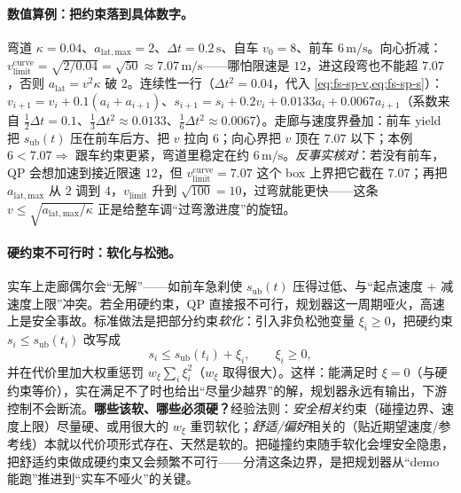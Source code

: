\paragraph{数值算例：把约束落到具体数字。}
弯道 $\kappa=0.04$、$a_{\mathrm{lat,max}}=2$、$\Delta t=0.2\,\mathrm{s}$、自车 $v_0=8$、前车 $6\,\mathrm{m/s}$。向心折减：$v_{\mathrm{limit}}^{\mathrm{curve}}=\sqrt{2/0.04}=\sqrt{50}\approx7.07\,\mathrm{m/s}$——哪怕限速是 $12$，进这段弯也不能超 $7.07$，否则 $a_{\mathrm{lat}}=v^2\kappa$ 破 $2$。连续性一行（$\Delta t^2=0.04$，代入 \cref{eq:fs-sp-v,eq:fs-sp-s}）：$v_{i+1}=v_i+0.1(a_i+a_{i+1})$、$s_{i+1}=s_i+0.2v_i+0.0133a_i+0.0067a_{i+1}$（系数来自 $\tfrac12\Delta t=0.1$、$\tfrac13\Delta t^2\approx0.0133$、$\tfrac16\Delta t^2\approx0.0067$）。走廊与速度界叠加：前车 yield 把 $s_{\mathrm{ub}}(t)$ 压在前车后方、把 $v$ 拉向 $6$；向心界把 $v$ 顶在 $7.07$ 以下；本例 $6<7.07\Rightarrow$ 跟车约束更紧，弯道里稳定在约 $6\,\mathrm{m/s}$。\emph{反事实核对}：若没有前车，QP 会想加速到接近限速 $12$，但 $v_{\mathrm{limit}}^{\mathrm{curve}}=7.07$ 这个 box 上界把它截在 $7.07$；再把 $a_{\mathrm{lat,max}}$ 从 $2$ 调到 $4$，$v_{\mathrm{limit}}$ 升到 $\sqrt{100}=10$，过弯就能更快——这条 $v\le\sqrt{a_{\mathrm{lat,max}}/\kappa}$ 正是给整车调“过弯激进度”的旋钮。

\paragraph{硬约束不可行时：软化与松弛。}
实车上走廊偶尔会“无解”——如前车急刹使 $s_{\mathrm{ub}}(t)$ 压得过低、与“起点速度 + 减速度上限”冲突。若全用硬约束，QP 直接报不可行，规划器这一周期哑火，高速上是安全事故。标准做法是把部分约束\emph{软化}：引入非负松弛变量 $\xi_i\ge0$，把硬约束 $s_i\le s_{\mathrm{ub}}(t_i)$ 改写成
\begin{equation}
  s_i\le s_{\mathrm{ub}}(t_i)+\xi_i,\qquad\xi_i\ge0,
  \label{eq:fs-slack}
\end{equation}
并在代价里加大权重惩罚 $w_\xi\sum_i\xi_i^2$（$w_\xi$ 取得很大）。这样：能满足时 $\xi=0$（与硬约束等价），实在满足不了时也给出“尽量少越界”的解，规划器永远有输出，下游控制不会断流。\textbf{哪些该软、哪些必须硬？}经验法则：\emph{安全相关}约束（碰撞边界、速度上限）尽量硬、或用很大的 $w_\xi$ 重罚软化；\emph{舒适/偏好}相关的（贴近期望速度/参考线）本就以代价项形式存在、天然是软的。把碰撞约束随手软化会埋安全隐患，把舒适约束做成硬约束又会频繁不可行——分清这条边界，是把规划器从“demo 能跑”推进到“实车不哑火”的关键。

